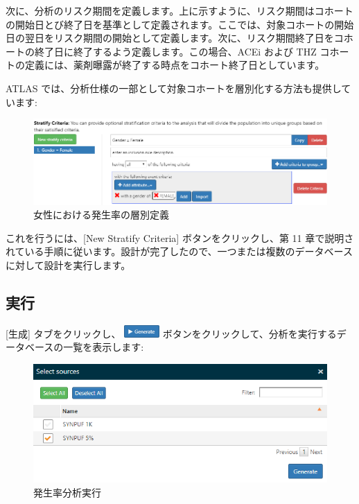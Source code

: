 \documentclass[
  11pt]{book}
\theoremstyle{definition}
\theoremstyle{definition}
\theoremstyle{definition}
\theoremstyle{definition}
\theoremstyle{remark}
\begin{document}
次に、分析のリスク期間を定義します。上に示すように、リスク期間はコホートの開始日とび終了日を基準として定義されます。ここでは、対象コホートの開始日の翌日をリスク期間の開始として定義します。次に、リスク期間終了日をコホートの終了日に終了するよう定義します。この場合、ACEi および THZ コホートの定義には、薬剤曝露が終了する時点をコホート終了日としています。

ATLAS では、分析仕様の一部として対象コホートを層別化する方法も提供しています:

\begin{figure}

{\centering \includegraphics[width=1\linewidth]{images/Characterization/atlasIncidenceStratifyFemale} 

}

\caption{女性における発生率の層別定義}\label{fig:atlasIncidenceStratifyFemale}
\end{figure}

これを行うには、{[}New Stratify Criteria{]} ボタンをクリックし、第 11 章で説明されている手順に従います。設計が完了したので、一つまたは複数のデータベースに対して設計を実行します。

\subsection{実行}\label{ux5b9fux884c-2}

{[}生成{]} タブをクリックし、 \includegraphics{images/Characterization/atlasIncidenceGenerate.png} ボタンをクリックして、分析を実行するデータベースの一覧を表示します:

\begin{figure}

{\centering \includegraphics[width=1\linewidth]{images/Characterization/atlasIncidenceSourceSelection} 

}

\caption{発生率分析実行}\label{fig:atlasIncidenceSourceSelection}
\end{figure}
\end{document}
